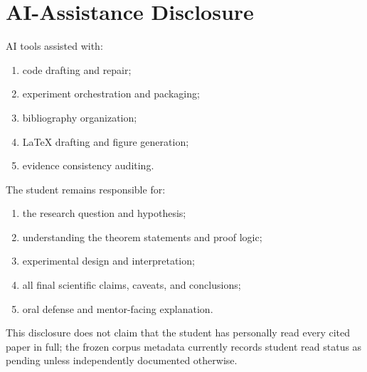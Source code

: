 \section{AI-Assistance Disclosure}
\label{app:ai}

AI tools assisted with:
\begin{enumerate}[label=\arabic*.]
  \item code drafting and repair;
  \item experiment orchestration and packaging;
  \item bibliography organization;
  \item LaTeX drafting and figure generation;
  \item evidence consistency auditing.
\end{enumerate}

The student remains responsible for:
\begin{enumerate}[label=\arabic*.]
  \item the research question and hypothesis;
  \item understanding the theorem statements and proof logic;
  \item experimental design and interpretation;
  \item all final scientific claims, caveats, and conclusions;
  \item oral defense and mentor-facing explanation.
\end{enumerate}

This disclosure does not claim that the student has personally read every cited paper in full; the frozen corpus metadata currently records student read status as pending unless independently documented otherwise.
